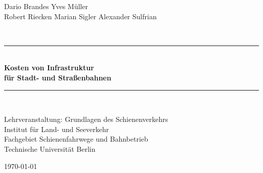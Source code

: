 \documentclass[oneside,a4paper,11pt,german]{report}
\date{\today}
\begin{document}
\begin{titlepage}
  \begin{center}
    \begin{minipage}{0.8\textwidth}
      \vspace{2cm}
      \begin{center}
        {\large
          Dario {Brandes} \quad
          Yves {Müller} \quad\\[5pt]
          Robert {Riecken} \quad
          Marian {Sigler} \quad
          Alexander {Sulfrian}
        }
      \end{center}
    \end{minipage}\\[1.5cm]

    \rule{\linewidth}{0.5mm} \\[0.4cm]
    { \huge \bfseries Kosten von Infrastruktur \\[15pt] für Stadt- und Straßenbahnen}\\[0.4cm]

    \rule{\linewidth}{0.5mm} \\[1.5cm]

    \begin{center}
      Lehrveranstaltung: Grundlagen des Schienenverkehrs\\[2cm]
      Institut für Land- und Seeverkehr \\[5pt]
      Fachgebiet Schienenfahrwege und Bahnbetrieb\\[5pt]
      Technische Universität Berlin
    \end{center}

    \vfill

    {\large \today}
  \end{center}
\end{titlepage}

\begin{comment}
Gliederung:

* Einleitung


* Theorie / Grundlagen
  * Definitionen: Kein EBO, Trennung U-Bahn/Straßenbahn (Tunnel vs. nein)
  * Methode
     * wie wurden die Zahlen versucht zu ermitteln
     * welche Kennwerte wurden wie berechnet (kosten/strecken km)
     * warum sind die Kennwerte sinvoll

* Ergebnisse
  * Vorstellung der Projekte
    * Beschreibung der Strecke
    * momentaner Baustand / Plannungsstand
  * Tabelle allen Ergbnissen

* Auswertung
  * Ermittlung von Höchsts- /  Durchschnittswerten Inland getrennt U-Bahnen/Straßenbahnen
    * tabellarisch
    * mit Hilfe von Diagrammen
  * Vergleich mit den Werten im Ausland
  * Fehleranalyse (welche Außreißer existieren warum)

* Zusammenfassung


TODO:

 * Karten für alle Strecken erstellen und einfügen.
 * Tabelle mit Quellenangaben generieren.

\end{comment}
\end{document}

